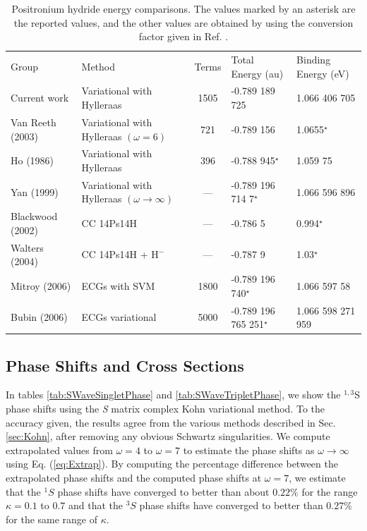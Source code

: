\documentclass[preprint,showpacs,preprintnumbers,amsmath,amssymb]{revtex4}
\begin{document}
\squeezetable  %
\begin{table}[H]
\begin{center}
\begin{ruledtabular}  %
\begin{tabular}{l l c l l}
Group & Method & Terms & Total Energy (au) & Binding Energy (eV)\\
\colrule
Current work & Variational with Hylleraas & 1505 & -0.789 189 725 & 1.066 406 705 \\
Van Reeth (2003) \cite{VanReeth2003} & Variational with Hylleraas $(\omega = 6)$ & 721 & -0.789 156 & 1.0655$^\star$ \\
Ho (1986) \cite{Ho1986} & Variational with Hylleraas & 396 & -0.788 945$^\star$ & 1.059 75 \\
Yan (1999) \cite{Yan1999} & Variational with Hylleraas $(\omega \rightarrow \infty)$ & --- & -0.789 196 714 7$^\star$ & 1.066 596 896 \\
Blackwood (2002) \cite{Blackwood2002} & CC 14Ps14H & --- & -0.786 5 & 0.994$^\star$ \\
Walters (2004) \cite{Walters2004} & CC 14Ps14H + $\text{H}^-$ & --- & -0.787 9 & 1.03$^\star$\\
Mitroy (2006) \cite{Mitroy2006} & ECGs with SVM & 1800 & -0.789 196 740$^\star$ & 1.066 597 58 \\
Bubin (2006) \cite{Bubin2006} & ECGs variational & 5000 & -0.789 196 765 251$^\star$ & 1.066 598 271 959 \\
\end{tabular}
\end{ruledtabular}
\caption{Positronium hydride energy comparisons. The values marked by an asterisk are the reported values, and the other values are obtained by using the conversion factor given in Ref. \cite{NISTConversions}.}
\label{tab:BoundEnergy}
\end{center}
\end{table}


\subsection{Phase Shifts and Cross Sections}

In tables \ref{tab:SWaveSingletPhase} and \ref{tab:SWaveTripletPhase}, we show the $^{1,3}$S phase shifts using the \emph{S} matrix complex Kohn variational method. To the accuracy given, the results agree from the various methods described in Sec. \ref{sec:Kohn}, after removing any obvious Schwartz singularities. We compute extrapolated values from $\omega = 4$ to $\omega = 7$ to estimate the phase shifts as $\omega \rightarrow \infty$ using Eq. (\ref{eq:Extrap}). By computing the percentage difference between the extrapolated phase shifts and the computed phase shifts at $\omega=7$, we estimate that the $^1S$ phase shifts have converged to better than about $0.22\%$ for the range $\kappa=0.1$ to $0.7$ and that the $^3S$ phase shifts have converged to better than $0.27\%$ for the same range of $\kappa$.
\end{document}
